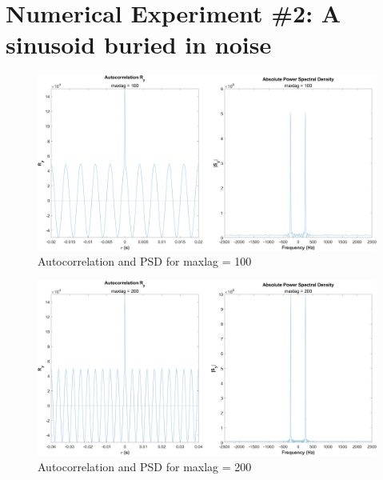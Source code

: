 \documentclass[12pt]{article}
\begin{document}

\section*{Numerical Experiment \#2: A sinusoid buried in noise}




\begin{figure}[h]
	\centering
	\includegraphics[width=\textwidth]{exp2_maxlag_100}
	\caption{\label{fig:exp2_maxlag100}Autocorrelation and PSD for maxlag = 100}
\end{figure}

\begin{figure}[h]
	\centering
	\includegraphics[width=\textwidth]{exp2_maxlag_200}
	\caption{\label{fig:exp2_maxlag200}Autocorrelation and PSD for maxlag = 200}
\end{figure}
\end{document}
